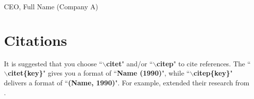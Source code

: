 \begin{flushright} CEO, Full Name (Company A) \end{flushright}


\section{Citations}
\label{subSec:Citations}

It is suggested that you choose ``\textbf{$\backslash$citet}" and/or ``\textbf{$\backslash$citep}" to cite references. The ``\textbf{$\backslash$citet\{key\}}" gives you a format of  ``\textbf{Name (1990)}", while ``\textbf{$\backslash$citep\{key\}}" delivers a format of ``\textbf{(Name, 1990)}". For example, \citet{Wang&Zeng:2009} extended their research from \citep{Zeng:2008}.
